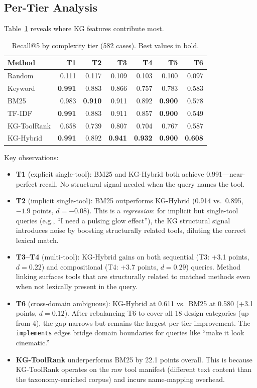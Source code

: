 \documentclass[11pt,a4paper]{article}
\begin{document}
\subsection{Per-Tier Analysis}

Table~\ref{tab:per-tier} reveals where KG features contribute most.

\begin{table}[t]
\centering
\caption{Recall@5 by complexity tier (582 cases). Best values in bold.}
\label{tab:per-tier}
\begin{tabular}{lrrrrrr}
\toprule
Method & T1 & T2 & T3 & T4 & T5 & T6 \\
\midrule
Random & 0.111 & 0.117 & 0.109 & 0.103 & 0.100 & 0.097 \\
Keyword & \textbf{0.991} & 0.883 & 0.866 & 0.757 & 0.783 & 0.583 \\
BM25 & 0.983 & \textbf{0.910} & 0.911 & 0.892 & \textbf{0.900} & 0.578 \\
TF-IDF & \textbf{0.991} & 0.883 & 0.911 & 0.857 & \textbf{0.900} & 0.549 \\
KG-ToolRank & 0.658 & 0.739 & 0.807 & 0.704 & 0.767 & 0.587 \\
KG-Hybrid & \textbf{0.991} & 0.892 & \textbf{0.941} & \textbf{0.932} & \textbf{0.900} & \textbf{0.608} \\
\bottomrule
\end{tabular}
\end{table}

Key observations:
\begin{itemize}
  \item \textbf{T1} (explicit single-tool): BM25 and KG-Hybrid both achieve 0.991---near-perfect recall. No structural signal needed when the query names the tool.
  \item \textbf{T2} (implicit single-tool): BM25 outperforms KG-Hybrid (0.914 vs.\ 0.895, $-1.9$ points, $d=-0.08$). This is a \emph{regression}: for implicit but single-tool queries (e.g., ``I need a pulsing glow effect''), the KG structural signal introduces noise by boosting structurally related tools, diluting the correct lexical match.
  \item \textbf{T3--T4} (multi-tool): KG-Hybrid gains on both sequential (T3: +3.1 points, $d=0.22$) and compositional (T4: +3.7 points, $d=0.29$) queries. Method linking surfaces tools that are structurally related to matched methods even when not lexically present in the query.
  \item \textbf{T6} (cross-domain ambiguous): KG-Hybrid at 0.611 vs.\ BM25 at 0.580 (+3.1 points, $d=0.12$). After rebalancing T6 to cover all 18 design categories (up from 4), the gap narrows but remains the largest per-tier improvement. The \texttt{implements} edges bridge domain boundaries for queries like ``make it look cinematic.''
  \item \textbf{KG-ToolRank} underperforms BM25 by 22.1 points overall. This is because KG-ToolRank operates on the raw tool manifest (different text content than the taxonomy-enriched corpus) and incurs name-mapping overhead.
\end{itemize}
\end{document}
